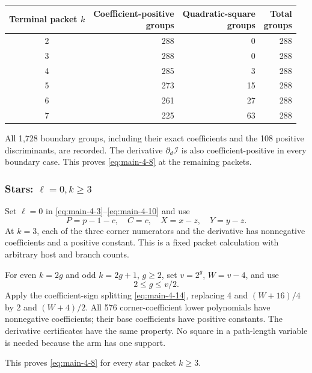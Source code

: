 \documentclass[11pt,reqno]{amsart}
\theoremstyle{plain}
\begin{document}
\begin{center}
\begin{tabular}{@{}c r r r@{}}
\toprule
\shortstack{\textbf{Terminal}\\\textbf{packet} $k$} &
\shortstack{\textbf{Coefficient-positive}\\\textbf{groups}} &
\shortstack{\textbf{Quadratic-square}\\\textbf{groups}} &
\shortstack{\textbf{Total}\\\textbf{groups}} \\
\midrule
2 & 288 & 0 & 288 \\
3 & 288 & 0 & 288 \\
4 & 285 & 3 & 288 \\
5 & 273 & 15 & 288 \\
6 & 261 & 27 & 288 \\
7 & 225 & 63 & 288 \\
\bottomrule
\end{tabular}
\end{center}

All 1,728 boundary groups, including their exact coefficients and the 108 positive discriminants, are recorded. The derivative \(\partial_d\mathcal I\) is also coefficient-positive in every boundary case. This proves \eqref{eq:main-4-8} at the remaining packets.

\subsubsection*{\texorpdfstring{Stars: \(\ell=0,k\ge3\)}{Stars: ell = 0, k >= 3}}\label{stars-ell0kge3}

Set \(\ell=0\) in \eqref{eq:main-4-3}--\eqref{eq:main-4-10} and use \[
P=p-1-c,\quad C=c,\quad X=x-z,\quad Y=y-z.
\] At \(k=3\), each of the three corner numerators and the derivative has nonnegative coefficients and a positive constant. This is a fixed packet calculation with arbitrary host and branch counts.

For even \(k=2g\) and odd \(k=2g+1\), \(g\ge2\), set \(v=2^g\), \(W=v-4\), and use \[
2\le g\le v/2.
\] Apply the coefficient-sign splitting \eqref{eq:main-4-14}, replacing 4 and \((W+16)/4\) by 2 and \((W+4)/2\). All 576 corner-coefficient lower polynomials have nonnegative coefficients; their base coefficients have positive constants. The derivative certificates have the same property. No square in a path-length variable is needed because the arm has one support.

This proves \eqref{eq:main-4-8} for every star packet \(k\ge3\).
\end{document}
